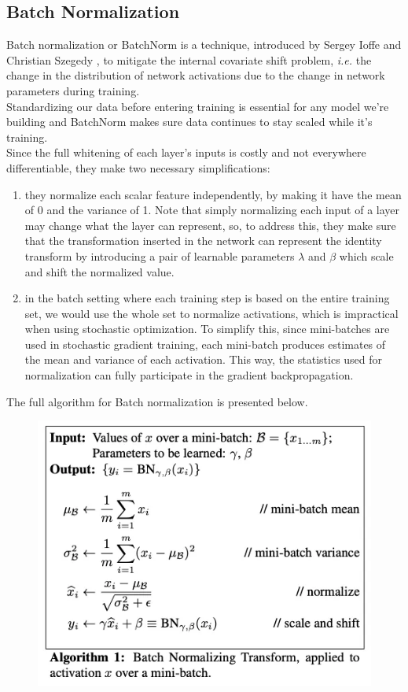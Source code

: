 \subsection{Batch Normalization}
Batch normalization or BatchNorm is a technique, introduced by Sergey Ioffe and Christian Szegedy \cite{ioffe2015batch}, to mitigate the internal covariate shift problem, \textit{i.e.} the change in the distribution of network activations due to the change in network parameters during training. \\
Standardizing our data before entering training is essential for any model we’re building and BatchNorm makes sure data continues to stay scaled while it’s training. \\
Since the full whitening of each layer’s inputs is costly and not everywhere differentiable, they make two necessary simplifications:
\begin{enumerate}
    \item they normalize each scalar feature independently, by making it have the mean of 0 and the variance of 1. Note that simply normalizing each input of a layer may change what the layer can represent, so, to address this, they make sure that the transformation inserted in the network can represent the identity transform by introducing a pair of learnable parameters $\lambda$ and $\beta$ which scale and shift the normalized value.
    \item in the batch setting where each training step is based on the entire training set, we would use the whole set to normalize activations, which is impractical when using stochastic optimization. To simplify this, since mini-batches are used in stochastic gradient training, each mini-batch produces estimates of the mean and variance of each activation. This way, the statistics used for normalization can fully participate in the gradient backpropagation.
\end{enumerate}

\noindent The full algorithm for Batch normalization is presented below.

\begin{figure}[H]
    \centering
    \includegraphics[width=0.65\linewidth]{Images/BatchNorm.png}
    \label{fig:BatchNorm}
\end{figure}

